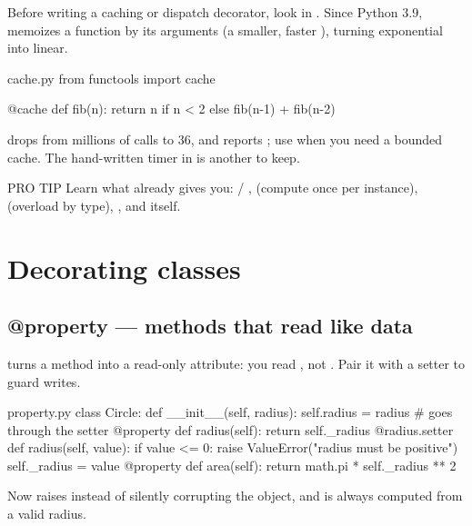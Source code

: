 Before writing a caching or dispatch decorator, look in . Since Python 3.9,  memoizes a function by its arguments (a smaller, faster ), turning exponential  into linear.

\begin{pycard}{cache.py}
from functools import cache

@cache
def fib(n):
    return n if n < 2 else fib(n-1) + fib(n-2)
\end{pycard}

 drops from millions of calls to 36, and  reports ; use  when you need a bounded cache. The hand-written timer in  is another to keep.

\begin{callout}[dotgreen]{PRO TIP}
Learn what  already gives you:  / ,  (compute once per instance),  (overload by type), , and  itself.
\end{callout}

\section{Decorating classes}

\subsection{@property — methods that read like data}

 turns a method into a read-only attribute: you read , not . Pair it with a setter to guard writes.

\begin{pycard}{property.py}
class Circle:
    def __init__(self, radius):
        self.radius = radius        # goes through the setter
    @property
    def radius(self):
        return self._radius
    @radius.setter
    def radius(self, value):
        if value <= 0:
            raise ValueError("radius must be positive")
        self._radius = value
    @property
    def area(self):
        return math.pi * self._radius ** 2
\end{pycard}

Now  raises instead of silently corrupting the object, and  is always computed from a valid radius.

